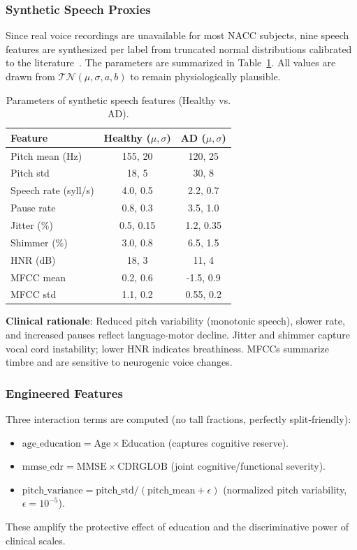 \documentclass[conference]{IEEEtran}
\begin{document}
\subsubsection*{Synthetic Speech Proxies}
Since real voice recordings are unavailable for most NACC subjects, nine speech features are synthesized per label from truncated normal distributions calibrated to the literature~\cite{luz2020adress, hoffman2015}. The parameters are summarized in Table~\ref{tab:speech_params}. All values are drawn from $\mathcal{TN}(\mu,\sigma,a,b)$ to remain physiologically plausible.

\begin{table}[htbp]
\centering
\caption{Parameters of synthetic speech features (Healthy vs. AD).}
\label{tab:speech_params}
\begin{tabular}{@{}lcc@{}}
\toprule
\textbf{Feature} & \textbf{Healthy ($\mu,\sigma$)} & \textbf{AD ($\mu,\sigma$)} \\
\midrule
Pitch mean (Hz) & 155, 20 & 120, 25 \\
Pitch std & 18, 5 & 30, 8 \\
Speech rate (syll/s) & 4.0, 0.5 & 2.2, 0.7 \\
Pause rate & 0.8, 0.3 & 3.5, 1.0 \\
Jitter (\%) & 0.5, 0.15 & 1.2, 0.35 \\
Shimmer (\%) & 3.0, 0.8 & 6.5, 1.5 \\
HNR (dB) & 18, 3 & 11, 4 \\
MFCC mean & 0.2, 0.6 & -1.5, 0.9 \\
MFCC std & 1.1, 0.2 & 0.55, 0.2 \\
\bottomrule
\end{tabular}
\end{table}

\textbf{Clinical rationale}: Reduced pitch variability (monotonic speech), slower rate, and increased pauses reflect language‑motor decline. Jitter and shimmer capture vocal cord instability; lower HNR indicates breathiness. MFCCs summarize timbre and are sensitive to neurogenic voice changes.

\subsubsection*{Engineered Features}
Three interaction terms are computed (no tall fractions, perfectly split‑friendly):
\begin{itemize}[leftmargin=*, nosep]
  \item $\text{age\_education} = \text{Age} \times \text{Education}$ (captures cognitive reserve).
  \item $\text{mmse\_cdr} = \text{MMSE} \times \text{CDRGLOB}$ (joint cognitive/functional severity).
  \item $\text{pitch\_variance} = \text{pitch\_std} / (\text{pitch\_mean} + \epsilon)$ (normalized pitch variability, $\epsilon=10^{-5}$).
\end{itemize}
These amplify the protective effect of education and the discriminative power of clinical scales.
\end{document}
